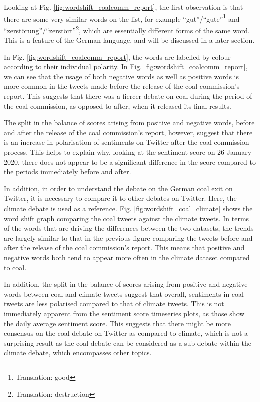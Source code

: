 \documentclass[12pt,onecolumn,twoside]{layout}
\begin{document}
Looking at Fig. \ref{fig:wordshift_coalcomm_report}, the first observation is that there are some very similar words on the list, for example ``gut''/``gute''\footnote{Translation: good} and ``zerstörung''/``zerstört''\footnote{Translation: destruction}, which are essentially different forms of the same word. This is a feature of the German language, and will be discussed in a later section.

In Fig. \ref{fig:wordshift_coalcomm_report}, the words are labelled by colour according to their individual polarity. In Fig. \ref{fig:wordshift_coalcomm_report}, we can see that the usage of both negative words as well as positive words is more common in the tweets made before the release of the coal commission's report. This suggests that there was a fiercer debate on coal during the period of the coal commission, as opposed to after, when it released its final results.

The split in the balance of scores arising from positive and negative words, before and after the release of the coal commission's report, however, suggest that there is an increase in polarisation of sentiments on Twitter after the coal commission process. This helps to explain why, looking at the sentiment score on 26 January 2020, there does not appear to be a significant difference in the score compared to the periods immediately before and after.

In addition, in order to understand the debate on the German coal exit on Twitter, it is necessary to compare it to other debates on Twitter. Here, the climate debate is used as a reference. Fig. \ref{fig:wordshift_coal_climate} shows the word shift graph comparing the coal tweets against the climate tweets. In terms of the words that are driving the differences between the two datasets, the trends are largely similar to that in the previous figure comparing the tweets before and after the release of the coal commission's report. This means that positive and negative words both tend to appear more often in the climate dataset compared to coal.

In addition, the split in the balance of scores arising from positive and negative words between coal and climate tweets suggest that overall, sentiments in coal tweets are less polarised compared to that of climate tweets. This is not immediately apparent from the sentiment score timeseries plots, as those show the daily average sentiment score. This suggests that there might be more consensus on the coal debate on Twitter as compared to climate, which is not a surprising result as the coal debate can be considered as a sub-debate within the climate debate, which encompasses other topics.
\end{document}
